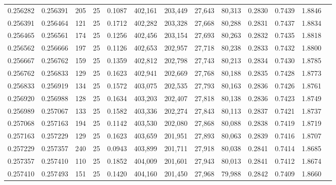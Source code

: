 \begin{tabular}{rrrrrrrrrrrrr}
0.256282 & 0.256391 &   205 &  25 &                                     0.1087 & 402,161 & 203,449 &  27,643 &  80,313 & 0.2830 & 0.7439 & 1.8846 \\
0.256391 & 0.256464 &   121 &  25 &                                     0.1712 & 402,282 & 203,328 &  27,668 &  80,288 & 0.2831 & 0.7437 & 1.8834 \\
0.256465 & 0.256561 &   174 &  25 &                                     0.1256 & 402,456 & 203,154 &  27,693 &  80,263 & 0.2832 & 0.7435 & 1.8818 \\
0.256562 & 0.256666 &   197 &  25 &                                     0.1126 & 402,653 & 202,957 &  27,718 &  80,238 & 0.2833 & 0.7432 & 1.8800 \\
0.256667 & 0.256762 &   159 &  25 &                                     0.1359 & 402,812 & 202,798 &  27,743 &  80,213 & 0.2834 & 0.7430 & 1.8785 \\
0.256762 & 0.256833 &   129 &  25 &                                     0.1623 & 402,941 & 202,669 &  27,768 &  80,188 & 0.2835 & 0.7428 & 1.8773 \\
0.256833 & 0.256919 &   134 &  25 &                                     0.1572 & 403,075 & 202,535 &  27,793 &  80,163 & 0.2836 & 0.7426 & 1.8761 \\
0.256920 & 0.256988 &   128 &  25 &                                     0.1634 & 403,203 & 202,407 &  27,818 &  80,138 & 0.2836 & 0.7423 & 1.8749 \\
0.256989 & 0.257067 &   133 &  25 &                                     0.1582 & 403,336 & 202,274 &  27,843 &  80,113 & 0.2837 & 0.7421 & 1.8737 \\
0.257068 & 0.257163 &   194 &  25 &                                     0.1142 & 403,530 & 202,080 &  27,868 &  80,088 & 0.2838 & 0.7419 & 1.8719 \\
0.257163 & 0.257229 &   129 &  25 &                                     0.1623 & 403,659 & 201,951 &  27,893 &  80,063 & 0.2839 & 0.7416 & 1.8707 \\
0.257229 & 0.257357 &   240 &  25 &                                     0.0943 & 403,899 & 201,711 &  27,918 &  80,038 & 0.2841 & 0.7414 & 1.8685 \\
0.257357 & 0.257410 &   110 &  25 &                                     0.1852 & 404,009 & 201,601 &  27,943 &  80,013 & 0.2841 & 0.7412 & 1.8674 \\
0.257410 & 0.257493 &   151 &  25 &                                     0.1420 & 404,160 & 201,450 &  27,968 &  79,988 & 0.2842 & 0.7409 & 1.8660 \\

\end{tabular}
